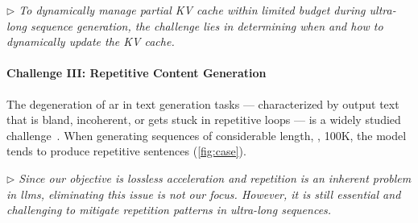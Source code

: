 \textit{$\rhd$ To dynamically manage partial KV cache within limited budget during ultra-long sequence generation, the challenge lies in determining when and how to dynamically update the KV cache.}
\paragraph{Challenge III: Repetitive Content Generation}
\label{sec:repeat}
The degeneration of \ac{ar} in text generation tasks — characterized by output text that is bland, incoherent, or gets stuck in repetitive loops — is a widely studied challenge~\citep{topp,minp,eta}. 
When generating sequences of considerable length, \eg, 100K, the model tends to produce repetitive sentences (\cref{fig:case}).



\textit{$\rhd$ Since our objective is lossless acceleration and repetition is an inherent problem in \acp{llm}, eliminating this issue is not our focus. However, it is still essential and challenging to mitigate repetition patterns in ultra-long sequences.}